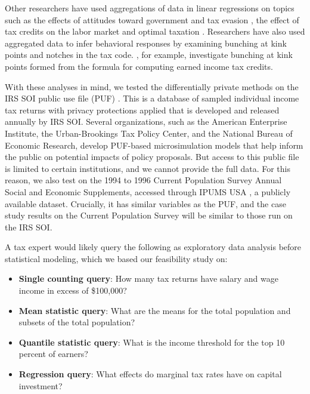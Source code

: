 Other researchers have used aggregations of data in linear regressions on topics such as the effects of attitudes toward government and tax evasion \citep{cullen2021political}, the effect of tax credits on the labor market \citep{tong2014impact} and optimal taxation \citep{piketty2014optimal}. Researchers have also used aggregated data to infer behavioral responses by examining bunching at kink points \citep{chetty2011adjustment} and notches \citep{kleven2013using} in the tax code. \citet{mortenson2020bunching}, for example, investigate bunching at kink points formed from the formula for computing earned income tax credits.

With these analyses in mind, we tested the differentially private methods on the IRS SOI public use file (PUF) \citep{barrientos2021}. This is a database of sampled individual income tax returns with privacy protections applied that is developed and released annually by IRS SOI. Several organizations, such as the American Enterprise Institute, the Urban-Brookings Tax Policy Center, and the National Bureau of Economic Research, develop PUF-based microsimulation models that help inform the public on potential impacts of policy proposals. But access to this public file is limited to certain institutions, and we cannot provide the full data. For this reason, we also test on the 1994 to 1996 Current Population Survey Annual Social and Economic Supplements, accessed through IPUMS USA \cite{ruggles2021cps}, a publicly available dataset. Crucially, it has similar variables as the PUF, and the case study results on the Current Population Survey will be similar to those run on the IRS SOI.

A tax expert would likely query the following as exploratory data analysis before statistical modeling, which we based our feasibility study on:

\begin{itemize}
    \item \textbf{Single counting query}: How many tax returns have salary and wage income in excess of \$100,000?
    \item \textbf{Mean statistic query}: What are the means for the total population and subsets of the total population?
    \item \textbf{Quantile statistic query}: What is the income threshold for the top 10 percent of earners?
    \item \textbf{Regression query}: What effects do marginal tax rates have on capital investment?
\end{itemize}


